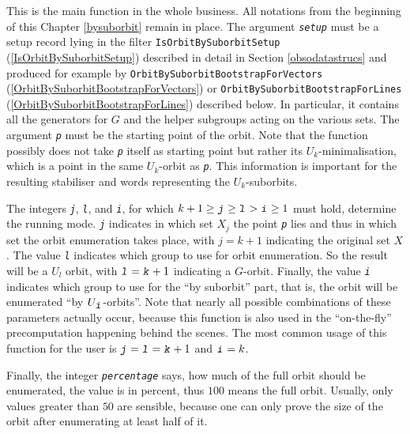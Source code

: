 \documentclass[a4paper,11pt]{report}
\begin{document}
{{{ This is the main function in the whole business. All notations from the
beginning of this Chapter \ref{bysuborbit} remain in place. The argument \mbox{\texttt{\mdseries\slshape setup}} must be a setup record lying in the filter \texttt{IsOrbitBySuborbitSetup} (\ref{IsOrbitBySuborbitSetup}) described in detail in Section \ref{obsodatastrucs} and produced for example by \texttt{OrbitBySuborbitBootstrapForVectors} (\ref{OrbitBySuborbitBootstrapForVectors}) or \texttt{OrbitBySuborbitBootstrapForLines} (\ref{OrbitBySuborbitBootstrapForLines}) described below. In particular, it contains all the generators for $G$ and the helper subgroups acting on the various sets. The argument \mbox{\texttt{\mdseries\slshape p}} must be the starting point of the orbit. Note that the function possibly does
not take \mbox{\texttt{\mdseries\slshape p}} itself as starting point but rather its $U_k$-minimalisation, which is a point in the same $U_k$-orbit as \mbox{\texttt{\mdseries\slshape p}}. This information is important for the resulting stabiliser and words
representing the $U_k$-suborbits. 

 The integers \mbox{\texttt{\mdseries\slshape j}}, \mbox{\texttt{\mdseries\slshape l}}, and \mbox{\texttt{\mdseries\slshape i}}, for which $k+1 \ge \mbox{\texttt{\mdseries\slshape j}} \ge \mbox{\texttt{\mdseries\slshape l}} > \mbox{\texttt{\mdseries\slshape i}} \ge 1$ must hold, determine the running mode. \mbox{\texttt{\mdseries\slshape j}} indicates in which set $X_j$ the point \mbox{\texttt{\mdseries\slshape p}} lies and thus in which set the orbit enumeration takes place, with $j=k+1$ indicating the original set $X$. The value \mbox{\texttt{\mdseries\slshape l}} indicates which group to use for orbit enumeration. So the result will be a $U_l$ orbit, with $\mbox{\texttt{\mdseries\slshape l}}=\mbox{\texttt{\mdseries\slshape k}}+1$ indicating a $G$-orbit. Finally, the value \mbox{\texttt{\mdseries\slshape i}} indicates which group to use for the ``by suborbit'' part, that is, the orbit will be enumerated ``by $U_{\mbox{\texttt{\mdseries\slshape i}}}$-orbits''. Note that nearly all possible combinations of these parameters actually
occur, because this function is also used in the ``on-the-fly'' precomputation happening behind the scenes. The most common usage of this
function for the user is $\mbox{\texttt{\mdseries\slshape j}}=\mbox{\texttt{\mdseries\slshape l}}=\mbox{\texttt{\mdseries\slshape k}}+1$ and $\mbox{\texttt{\mdseries\slshape i}}=k$. 

 Finally, the integer \mbox{\texttt{\mdseries\slshape percentage}} says, how much of the full orbit should be enumerated, the value is in
percent, thus $100$ means the full orbit. Usually, only values greater than $50$ are sensible, because one can only prove the size of the orbit after
enumerating at least half of it. 

}}}
\end{document}

